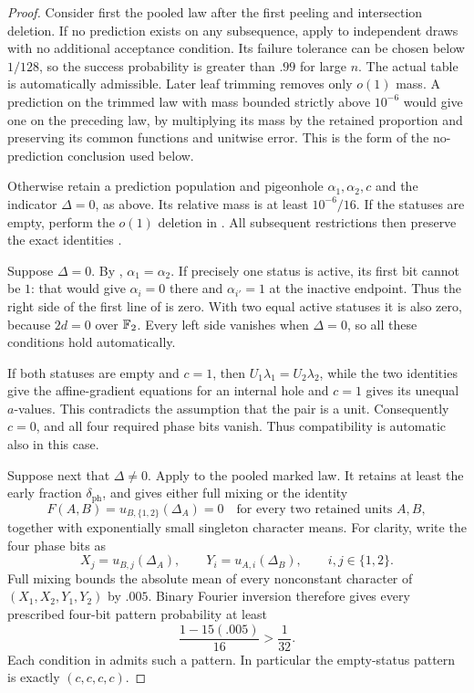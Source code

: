 \begin{proof}
Consider first the pooled law after the first peeling and
intersection deletion.  If no prediction exists on any subsequence,
apply  to independent draws with no additional
acceptance condition.  Its failure tolerance can be chosen below
\(1/128\), so the success probability is greater than \(.99\) for
large \(n\).  The actual table is automatically admissible.  Later
leaf trimming removes only \(o(1)\) mass.  A prediction on the
trimmed law with mass bounded strictly above \(10^{-6}\) would give
one on the preceding law, by multiplying its mass by the retained
proportion and preserving its common functions and unitwise error.
This is the form of the no-prediction conclusion used below.

Otherwise retain a prediction population and pigeonhole
\(\alpha_1,\alpha_2,c\) and the indicator \(\Delta=0\), as above.
Its relative mass is at least \(10^{-6}/16\).  If the statuses
are empty, perform the \(o(1)\) deletion in
.  All subsequent restrictions then preserve
the exact identities .

Suppose \(\Delta=0\).  By ,
\(\alpha_1=\alpha_2\).  If precisely one status is active, its
first bit cannot be \(1\): that would give \(\alpha_i=0\) there
and \(\alpha_{i'}=1\) at the inactive endpoint.  Thus the right
side of the first line of  is zero.
With two equal active statuses it is also zero, because \(2d=0\)
over \(\mathbb F_2\).  Every left side vanishes when \(\Delta=0\), so
all these conditions hold automatically.

If both statuses are empty and \(c=1\), then
\(U_1\lambda_1=U_2\lambda_2\), while the two identities
 give the affine-gradient equations
for an internal hole and \(c=1\) gives its unequal \(a\)-values.
This contradicts the assumption that the pair is a unit.
Consequently \(c=0\), and all four required phase bits vanish.
Thus compatibility is automatic also in this case.

Suppose next that \(\Delta\ne0\).  Apply
 to the pooled marked law.  It retains
at least the early fraction \(\delta_{\mathrm{ph}}\), and gives
either full mixing or the identity
\[
 F(A,B)=u_{B,\{1,2\}}(\Delta_A)=0
 \quad\text{for every two retained units }A,B,
\]
together with exponentially small singleton character means.
For clarity, write the four phase bits as
\[
 X_j=u_{B,j}(\Delta_A),\qquad
 Y_i=u_{A,i}(\Delta_B),\qquad i,j\in\{1,2\}.
\]
Full mixing bounds the absolute mean of every nonconstant
character of \((X_1,X_2,Y_1,Y_2)\) by \(.005\).  Binary Fourier
inversion therefore gives every prescribed four-bit pattern
probability at least
\[
 \frac{1-15(.005)}{16}>\frac1{32}.
\]
Each condition in  admits such a
pattern.  In particular the empty-status pattern is exactly
\((c,c,c,c)\).


\end{proof}
